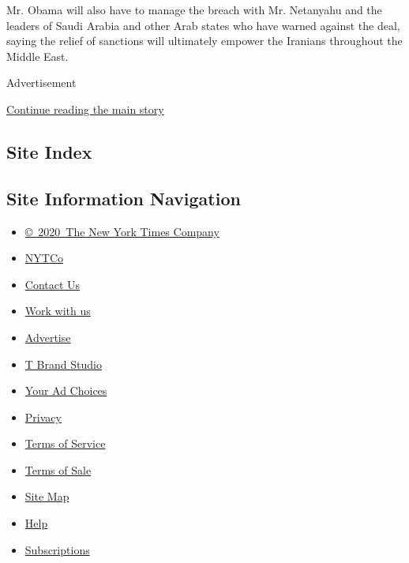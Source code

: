 Mr. Obama will also have to manage the breach with Mr. Netanyahu and the
leaders of Saudi Arabia and other Arab states who have warned against
the deal, saying the relief of sanctions will ultimately empower the
Iranians throughout the Middle East.

Advertisement

\protect\hyperlink{after-bottom}{Continue reading the main story}

\hypertarget{site-index}{%
\subsection{Site Index}\label{site-index}}

\hypertarget{site-information-navigation}{%
\subsection{Site Information
Navigation}\label{site-information-navigation}}

\begin{itemize}
\tightlist
\item
  \href{https://help.nytimes.com/hc/en-us/articles/115014792127-Copyright-notice}{©~2020~The
  New York Times Company}
\end{itemize}

\begin{itemize}
\tightlist
\item
  \href{https://www.nytco.com/}{NYTCo}
\item
  \href{https://help.nytimes.com/hc/en-us/articles/115015385887-Contact-Us}{Contact
  Us}
\item
  \href{https://www.nytco.com/careers/}{Work with us}
\item
  \href{https://nytmediakit.com/}{Advertise}
\item
  \href{http://www.tbrandstudio.com/}{T Brand Studio}
\item
  \href{https://www.nytimes.com/privacy/cookie-policy\#how-do-i-manage-trackers}{Your
  Ad Choices}
\item
  \href{https://www.nytimes.com/privacy}{Privacy}
\item
  \href{https://help.nytimes.com/hc/en-us/articles/115014893428-Terms-of-service}{Terms
  of Service}
\item
  \href{https://help.nytimes.com/hc/en-us/articles/115014893968-Terms-of-sale}{Terms
  of Sale}
\item
  \href{https://spiderbites.nytimes.com}{Site Map}
\item
  \href{https://help.nytimes.com/hc/en-us}{Help}
\item
  \href{https://www.nytimes.com/subscription?campaignId=37WXW}{Subscriptions}
\end{itemize}
